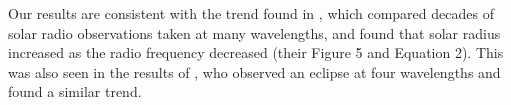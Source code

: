 Our results are consistent with the trend found in \cite{menezes_solar_2017}, which compared decades of solar radio observations taken at many wavelengths, and found that solar radius increased as the radio frequency decreased (their Figure 5 and Equation 2).
This was also seen in the results of \cite{messerotti_radio_2000}, who observed an eclipse at four wavelengths and found a similar trend.



